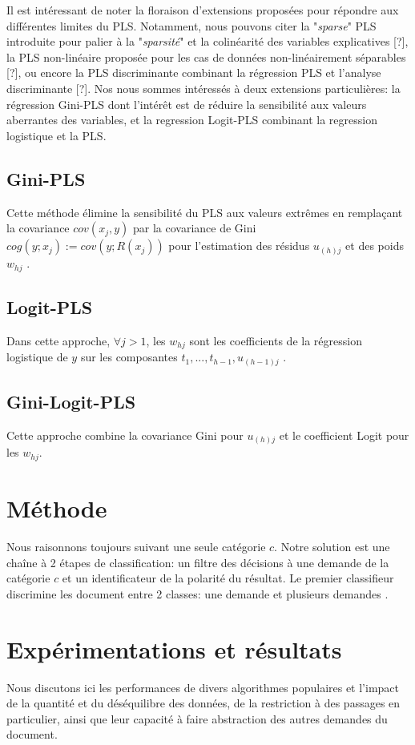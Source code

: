Il est intéressant de noter la floraison d'extensions proposées pour répondre aux différentes limites du PLS. Notamment, nous pouvons citer la "\textit{sparse}" PLS introduite pour palier à la "\textit{sparsité}" et la colinéarité des variables explicatives [?], la PLS non-linéaire proposée pour les cas de données non-linéairement séparables [?], ou encore la PLS discriminante combinant la régression PLS et l'analyse discriminante [?]. Nos nous sommes intéressés à deux extensions particulières: la régression Gini-PLS \citep{mussard2018ginipls} dont l'intérêt est de réduire la sensibilité aux valeurs aberrantes des variables, et la regression Logit-PLS \citep{tenenhaus2005logitpls}  combinant la regression logistique et la PLS.
\subsection{Gini-PLS}
Cette méthode élimine la sensibilité du PLS aux valeurs extrêmes en remplaçant la covariance $cov(x_j, y)$ par la covariance de Gini $cog(y; x_j) := cov(y; R(x_j))$ pour l'estimation des résidus $u_{(h)j}$ et des poids $w_{hj}$ \citep{mussard2018ginipls}.


\subsection{Logit-PLS}
Dans cette approche, $\forall j > 1$, les $w_{hj} $ sont les coefficients de la régression logistique de $y$ sur les composantes $t_1, ..., t_{h-1}, u_{(h-1)j}$ \cite{tenenhaus2005logitpls}.

\subsection{Gini-Logit-PLS}
Cette approche combine la covariance Gini pour $u_{(h)j}$ et le coefficient Logit pour les $w_{hj}$.


\section{Méthode}
Nous raisonnons toujours suivant une seule catégorie $c$. Notre solution est une chaîne à 2 étapes de classification: un filtre des décisions à une demande de la catégorie $c$ et un identificateur de la polarité du résultat. Le premier classifieur discrimine les document entre 2 classes: \og une demande \fg{} et \og plusieurs demandes \fg{}.

\section{Expérimentations et résultats}
\label{sec:sensresultat:experimentations}
Nous discutons ici les performances de divers algorithmes populaires et l'impact de la quantité et du déséquilibre des données, de la restriction à des passages en particulier, ainsi que leur capacité à faire abstraction des autres demandes du document. 

